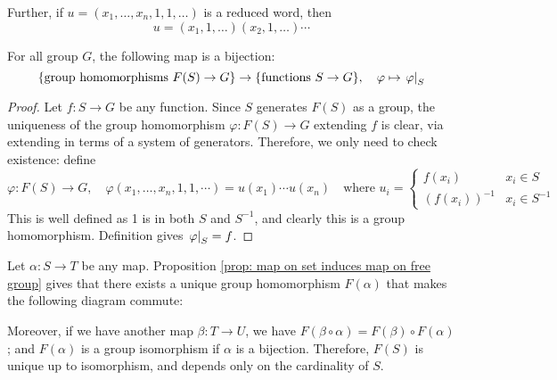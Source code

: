 Further, if $u = (x_1, \dots, x_n, 1, 1, \dots)$ is a reduced word, then
\[
    u = (x_1, 1, \dots) (x_2, 1, \dots) \cdots
\]

\begin{proposition}\label{prop: map on set induces map on free group}
    For all group $G$, the following map is a bijection:
    \[
        \{ \text{group homomorphisms $F(S) \to G$} \} \to \{ \text{functions $S \to G$} \}, \quad \varphi \mapsto \left.\varphi\right|_{S}
    \]
\end{proposition}

\begin{proof}
    Let $f: S \to G$ be any function. Since $S$ generates $F(S)$ as a group, the uniqueness of the group homomorphism $\varphi: F(S) \to G$ extending $f$ is clear, via extending in terms of a system of generators. Therefore, we only need to check existence: define
    \[
        \varphi: F(S) \to G, \quad \varphi(x_1, \dots, x_n, 1, 1, \cdots) = u(x_1) \cdots u(x_n) \quad \text{where }
        u_i = \begin{cases}
            f(x_i) & x_i \in S\\
            (f(x_i))^{-1} & x_i \in S^{-1}
        \end{cases}
    \]
    This is well defined as 1 is in both $S$ and $S^{-1}$, and clearly this is a group homomorphism. Definition gives $\left.\varphi\right|_{S} = f$.
\end{proof}

\begin{remark}
    Let $\alpha: S \to T$ be any map. Proposition \ref{prop: map on set induces map on free group} gives that there exists a unique group homomorphism $F(\alpha)$ that makes the following diagram commute:

    \begin{minipage}{\linewidth}
        \centering
    \end{minipage}
    Moreover, if we have another map $\beta: T \to U$, we have $F(\beta \circ \alpha) = F(\beta) \circ F(\alpha)$; and $F(\alpha)$ is a group isomorphism if $\alpha$ is a bijection. Therefore, $F(S)$ is unique up to isomorphism, and depends only on the cardinality of $S$.
\end{remark}


